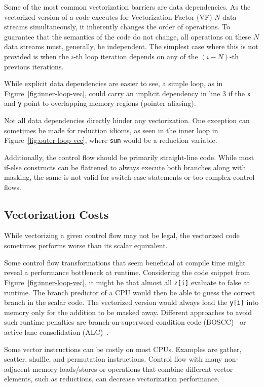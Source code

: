 \documentclass[sigplan,11pt,nonacm]{acmart}
\begin{document}
Some of the most common vectorization barriers are data dependencies. As the vectorized version
of a code executes for Vectorization Factor (VF) $N$ data streams simultaneously, it inherently changes
the order of operations. To guarantee that the semantics of the code do not change, all
operations on these $N$ data streams must, generally, be independent. The simplest case
where this is not provided is when the $i$-th loop iteration depends on any of the $(i-N)$-th 
previous iterations.

While explicit data dependencies are easier to see, a simple loop, as in 
Figure~\ref{fig:inner-loop-vec}, could carry an implicit dependency in line 3 if
the \texttt{x} and \texttt{y} point to overlapping memory regions (pointer aliasing).

Not all data dependencies directly hinder any vectorization. One exception can 
sometimes be made for reduction idioms, as seen in the inner loop in 
Figure~\ref{fig:outer-loop-vec}, where \texttt{sum} would be a reduction variable.

Additionally, the control flow should be primarily straight-line code. While most if-else 
constructs can be flattened to always execute both branches along with masking, the same is not 
valid for switch-case statements or too complex control flows.

\subsection{Vectorization Costs}
While vectorizing a given control flow may not be legal, the vectorized code sometimes performs 
worse than its scalar equivalent.

Some control flow transformations that seem beneficial at compile time might reveal a performance
bottleneck at runtime. Considering the code snippet from Figure~\ref{fig:inner-loop-vec}, it might
be that almost all \texttt{z[i]} evaluate to false at runtime. The branch predictor of a CPU
would then be able to guess the correct branch in the scalar code. The vectorized version would
always load the \texttt{y[i]} into memory only for the addition to be masked away. Different 
approaches to avoid such runtime penalties are branch-on-superword-condition code 
(BOSCC)~\cite{10.5555/1299042.1299055,llvmboscc} or active-lane 
consolidation (ALC)~\cite{10.1007/s11227-022-04359-w,10.5555/3615924.3615932}.

Some vector instructions can be costly on most CPUs. Examples are gather, scatter, shuffle,
and permutation instructions. Control flow with many non-adjacent memory loads/stores or 
operations that combine different vector elements, such as reductions, can decrease vectorization 
performance.
\end{document}
